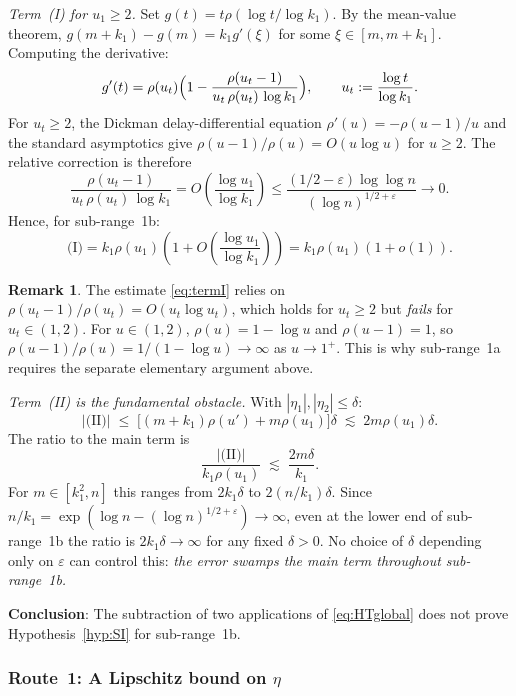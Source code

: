 \documentclass[12pt]{article}
\theoremstyle{definition}
\newtheorem{remark}[theorem]{Remark}
\begin{document}
\emph{Term~(I) for $u_1 \geq 2$.}
Set $g(t) = t\rho(\log t/\log k_1)$.  By the mean-value theorem,
$g(m+k_1) - g(m) = k_1 g'(\xi)$ for some $\xi \in [m, m+k_1]$.
Computing the derivative:
\[
  g'(t) = \rho(u_t)\Bigl(1 - \frac{\rho(u_t-1)}{u_t\,\rho(u_t)\,\log k_1}\Bigr),
  \qquad u_t := \frac{\log t}{\log k_1}.
\]
For $u_t \geq 2$, the Dickman delay-differential equation $\rho'(u) = -\rho(u-1)/u$
and the standard asymptotics \cite[Corollary~III.5.4]{Ten} give
$\rho(u-1)/\rho(u) = O(u\log u)$ for $u \geq 2$.
The relative correction is therefore
\[
  \frac{\rho(u_t-1)}{u_t\,\rho(u_t)\,\log k_1}
  = O\!\left(\frac{\log u_1}{\log k_1}\right)
  \leq \frac{(1/2-\varepsilon)\log\log n}{(\log n)^{1/2+\varepsilon}} \to 0.
\]
Hence, for sub-range~1b:
\begin{equation}\label{eq:termI}
  \text{(I)} = k_1\rho(u_1)\!\left(1 + O\!\left(\frac{\log u_1}{\log k_1}\right)\right)
  = k_1\rho(u_1)(1+o(1)).
\end{equation}

\begin{remark}
The estimate \eqref{eq:termI} relies on $\rho(u_t-1)/\rho(u_t) = O(u_t\log u_t)$,
which holds for $u_t \geq 2$ but \emph{fails} for $u_t \in (1,2)$.
For $u \in (1,2)$, $\rho(u) = 1-\log u$ and $\rho(u-1) = 1$,
so $\rho(u-1)/\rho(u) = 1/(1-\log u) \to \infty$ as $u\to 1^+$.
This is why sub-range~1a requires the separate elementary argument above.
\end{remark}

\emph{Term~(II) is the fundamental obstacle.}
With $|\eta_1|, |\eta_2| \leq \delta$:
\[
  |\text{(II)}| \;\leq\;
  \bigl[(m+k_1)\rho(u') + m\rho(u_1)\bigr]\delta
  \;\lesssim\; 2m\rho(u_1)\delta.
\]
The ratio to the main term is
\[
  \frac{|\text{(II)}|}{k_1\rho(u_1)} \;\lesssim\; \frac{2m\delta}{k_1}.
\]
For $m \in [k_1^2, n]$ this ranges from $2k_1\delta$ to $2(n/k_1)\delta$.
Since $n/k_1 = \exp(\log n - (\log n)^{1/2+\varepsilon}) \to \infty$,
even at the lower end of sub-range~1b the ratio is $2k_1\delta \to \infty$
for any fixed $\delta > 0$.
No choice of $\delta$ depending only on $\varepsilon$ can control this:
\emph{the error swamps the main term throughout sub-range~1b.}

\textbf{Conclusion}: The subtraction of two applications of \eqref{eq:HTglobal}
does not prove Hypothesis~\ref{hyp:SI} for sub-range~1b.

\subsubsection*{Route~1: A Lipschitz bound on $\eta$}
\end{document}
